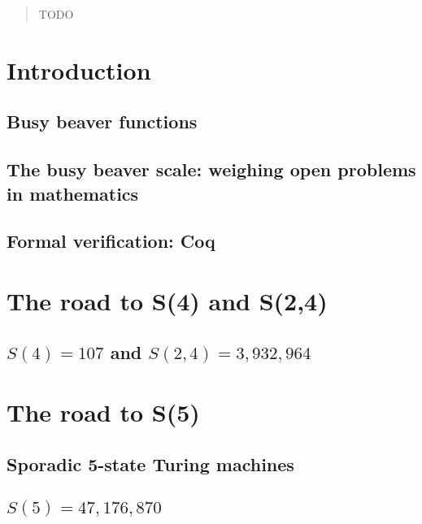 \documentclass[a4paper,british]{article}
\theoremstyle{definition} %
\numberwithin{equation}{section}
\theoremstyle{definition} %
\begin{document}
\date{}
\maketitle

\begin{abstract}
    TODO
\end{abstract}


\setcounter{tocdepth}{2}
\tableofcontents

\section{Introduction}
\subsection{Busy beaver functions}
\subsection{The busy beaver scale: weighing open problems in mathematics}
\subsection{Formal verification: Coq}

\section{The road to S(4) and S(2,4)}





\subsection{$S(4)=107$ and $S(2,4)=3,932,964$}

\section{The road to S(5)}



\subsection{Sporadic 5-state Turing machines}
\subsection{$S(5)=47,176,870$}
\end{document}
